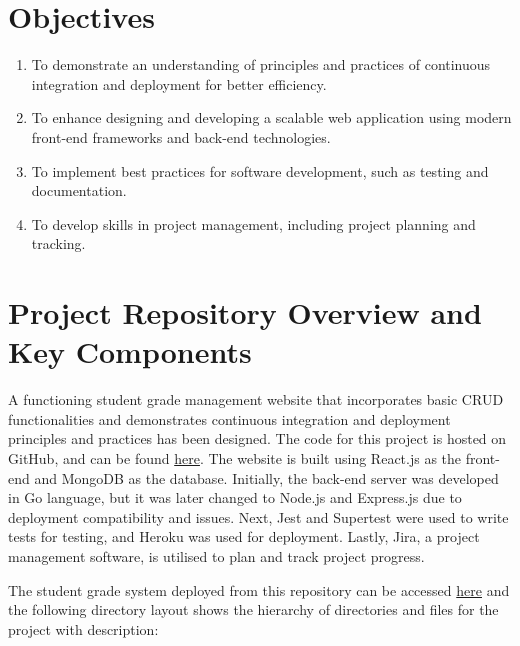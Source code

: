 \section{Objectives}
\begin{enumerate}
  \item To demonstrate an understanding of principles and practices of continuous integration and deployment for better efficiency.
  \item To enhance designing and developing a scalable web application using modern front-end frameworks and back-end technologies.
  \item To implement best practices for software development, such as testing and documentation.
  \item To develop skills in project management, including project planning and tracking.
\end{enumerate}

\section{Project Repository Overview and Key Components}
A functioning student grade management website that incorporates basic CRUD functionalities and demonstrates continuous integration and deployment principles and practices has been designed. The code for this project is hosted on GitHub, and can be found \href{https://github.com/gabhang/final-year-project}{here}. The website is built using React.js as the front-end and MongoDB as the database. Initially, the back-end server was developed in Go language, but it was later changed to Node.js and Express.js due to deployment compatibility and issues. Next, Jest and Supertest were used to write tests for testing, and Heroku was used for deployment. Lastly, Jira, a project management software, is utilised to plan and track project progress.

The student grade system deployed from this repository can be accessed \href{https://student-grade-system.herokuapp.com/}{here} and the following directory layout shows the hierarchy of directories and files for the project with description:\newline


